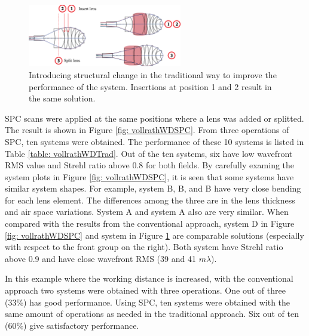 \newpage %

\begin{figure}[h!]
    \centering
    \includegraphics[width=0.6\textwidth]{chapter-4/figures/vollrathWDTrad.png}
    \caption{Introducing structural change in the traditional way to improve the performance of the system. Insertions at position \textcircled{\scriptsize{1}} and \textcircled{\scriptsize{2}} result in the same solution. }
    \label{fig: vollrathWDTrad}
\end{figure}
SPC scans were applied at the same positions where a lens was added or splitted. The result is shown in Figure \ref{fig: vollrathWDSPC}. From three operations of SPC, ten systems were obtained. The performance of these 10 systems is listed in Table \ref{table: vollrathWDTrad}. Out of the ten systems, six have low wavefront RMS value and Strehl ratio above 0.8 for both fields. By carefully examing the system plots in Figure \ref{fig: vollrathWDSPC}, it is seen that some systems have similar system shapes. For example, system B, B, and B have very close bending for each lens element. The differences among the three are in the lens thickness and air space variations. System A and system A also are very similar. When compared with the results from the conventional approach, system D in Figure \ref{fig: vollrathWDSPC} and system  in Figure \ref{fig: vollrathWDTrad} are comparable solutions (especially with respect to the front group on the right). Both system have Strehl ratio above 0.9 and have close wavefront RMS (39 and 41 $m\lambda$).

In this example where the working distance is increased, with the conventional approach two systems were obtained with three operations. One out of three (33\%) has good performance. Using SPC, ten systems were obtained with the same amount of operations as needed in the traditional approach. Six out of ten (60\%) give satisfactory performance. 

